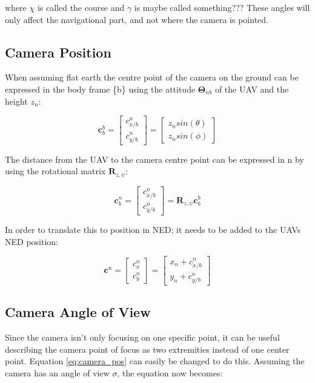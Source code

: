 where $\chi$ is called the course and $\gamma$ is maybe called something??? These angles will only affect the navigational part, and not where the camera is pointed.


\subsection{Camera Position}
When assuming flat earth the centre point of the camera on the ground can be expressed in the body frame \{b\} using the attitude $\bm{\Theta}_{nb}$ of the UAV and the height $z_n$:

\begin{equation} \label{eq:camera_pos}
	\bm{c}_b^b =
	\begin{bmatrix}
		c_{x/b}^n \\
		c_{y/b}^n
	\end{bmatrix}
	=
	\begin{bmatrix}
		z_n sin(\theta) \\
		z_n sin(\phi)
	\end{bmatrix}
\end{equation}

The distance from the UAV to the camera centre point can be expressed in {n} by using the rotational matrix $\bm{R}_{z,\psi}$:

\begin{equation} \label{eq:body_ned_rotate}
	\bm{c}_b^n =
	\begin{bmatrix}
		c_{x/b}^n \\
		c_{y/b}^n
	\end{bmatrix}
	= \bm{R}_{z,\psi} \bm{c}_b^b
\end{equation}
	
In order to translate this to position in NED; it needs to be added to the UAVs NED position:

\begin{equation} \label{eq:body_ned_trans}
	\bm{c}^n =
	\begin{bmatrix}
		c_x^n \\ c_y^n
	\end{bmatrix}
	=
	\begin{bmatrix}
		x_n + c_{x/b}^n \\
		y_n + c_{y/b}^n
	\end{bmatrix}
\end{equation}

\subsection{Camera Angle of View}
Since the camera isn't only focusing on one specific point, it can be useful describing the camera point of focus as two extremities instead of one center point. Equation \eqref{eq:camera_pos} can easily be changed to do this. Assuming the camera has an angle of view $\sigma$, the equation now becomes:

